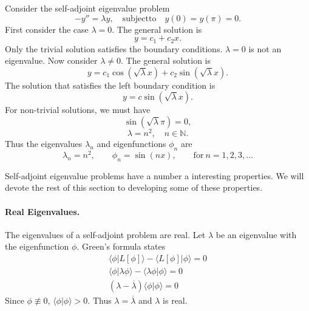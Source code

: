 \begin{Example}
  Consider the self-adjoint eigenvalue problem
  \[ 
  -y'' = \lambda y, \quad \mathrm{subject to} \quad y(0) = y(\pi) = 0.
  \]
  First consider the case $\lambda = 0$.  The general solution is
  \[ 
  y = c_1 + c_2 x.
  \]
  Only the trivial solution satisfies the boundary conditions. 
  $\lambda = 0$ is not an eigenvalue.
  Now consider $\lambda \neq 0$.  The general solution is
  \[ 
  y = c_1 \cos \left(\sqrt{\lambda} x \right) 
  + c_2 \sin \left(\sqrt{\lambda} x\right).
  \]
  The solution that satisfies the left boundary condition is
  \[
  y = c \sin \left( \sqrt{\lambda} x \right).
  \]
  For non-trivial solutions, we must have
  \[
  \sin \left( \sqrt{ \lambda } \pi \right) = 0,
  \]
  \[
  \lambda = n^2, \quad n \in \mathbb{N}.
  \]
  Thus the eigenvalues $\lambda_n$ and eigenfunctions $\phi_n$ are
  \[ 
  \boxed{
    \lambda_n = n^2, \qquad \phi_n = \sin(n x), \qquad 
    \mathrm{for}\ n = 1, 2, 3, \ldots 
    }
  \]
\end{Example}







Self-adjoint eigenvalue problems have a number a interesting properties.  We
will devote the rest of this section to developing some of these 
properties.


\paragraph{Real Eigenvalues.}  The eigenvalues of a self-adjoint problem
are real.  Let $\lambda$ be an eigenvalue with the eigenfunction $\phi$.
Green's formula states
\begin{gather*}
  \langle \phi | L[\phi] \rangle - \langle L[\phi] | \phi \rangle = 0 \\
  \langle \phi | \lambda \phi \rangle - \langle \lambda \phi | \phi \rangle = 0 \\
  (\lambda - \overline{\lambda}) \langle \phi | \phi \rangle = 0
\end{gather*}
Since $\phi \not\equiv 0$, $\langle \phi | \phi \rangle > 0$.  Thus 
$\lambda = \overline{\lambda}$ and $\lambda$ is real.







